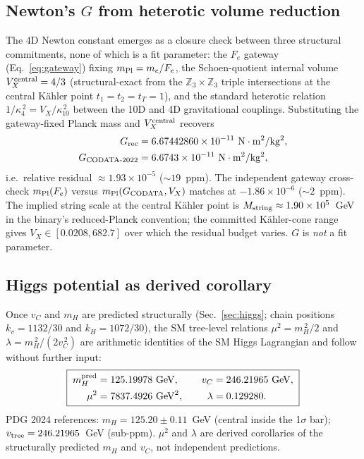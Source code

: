 ﻿\documentclass[reprint,amsmath,amssymb,aps,prd,longbibliography,floatfix]{revtex4-2}
\begin{document}
\subsection{Newton's $G$ from heterotic volume reduction}
\label{subsec:stage4-newton}

The 4D Newton constant emerges as a closure check between three
structural commitments, none of which is a fit parameter: the $F_e$
gateway (Eq.~\eqref{eq:gateway}) fixing $m_{\rm Pl} = m_e/F_e$, the
Schoen-quotient internal volume $V_X^{\rm central} = 4/3$ (structural-exact
from the $\mathbb{Z}_3 \times \mathbb{Z}_3$ triple intersections at the
central K\"ahler point $t_1 = t_2 = t_T = 1$), and the standard heterotic
relation $1/\kappa_4^{\,2} = V_X/\kappa_{10}^{\,2}$ between the 10D and
4D gravitational couplings. Substituting the gateway-fixed Planck mass
and $V_X^{\rm central}$ recovers
\begin{align*}
G_{\rm rec} &= 6.67442860 \times 10^{-11}~\mathrm{N\cdot m^2/kg^2}, \\
G_{\rm CODATA\text{-}2022} &= 6.6743 \times 10^{-11}~\mathrm{N\cdot m^2/kg^2},
\end{align*}
i.e.\ relative residual $\approx 1.93 \times 10^{-5}$ ($\sim 19$~ppm).
The independent gateway cross-check
$m_{\rm Pl}(F_e)$ versus $m_{\rm Pl}(G_{\rm CODATA}, V_X)$ matches at
$-1.86 \times 10^{-6}$ ($\sim 2$~ppm). The implied string scale at the
central K\"ahler point is $M_{\rm string} \approx 1.90 \times 10^{5}$~GeV
in the binary's reduced-Planck convention; the committed K\"ahler-cone
range gives $V_X \in [0.0208, 682.7]$ over which the residual budget
varies. $G$ is \emph{not} a fit parameter.

\subsection{Higgs potential as derived corollary}
\label{subsec:stage4-higgs}

Once $v_C$ and $m_H$ are predicted structurally
(Sec.~\ref{sec:higgs}; chain positions $k_v = 1132/30$ and
$k_H = 1072/30$), the SM tree-level relations
$\mu^2 = m_H^{\,2}/2$ and $\lambda = m_H^{\,2}/(2 v_C^{\,2})$
are arithmetic identities of the SM Higgs Lagrangian and follow
without further input:
\begin{equation}
\boxed{\;
\begin{aligned}
m_H^{\rm pred} &= 125.19978~\mathrm{GeV},
&\quad
v_C &= 246.21965~\mathrm{GeV}, \\
\mu^2 &= 7837.4926~\mathrm{GeV}^2,
&\quad
\lambda &= 0.129280.
\end{aligned}
\;}
\label{eq:stage4-higgs-corollaries}
\end{equation}
PDG 2024 references: $m_H = 125.20 \pm 0.11$~GeV (central inside the
1$\sigma$ bar); $v_{\rm tree} = 246.21965$~GeV (sub-ppm).
$\mu^2$ and $\lambda$ are derived corollaries of the structurally
predicted $m_H$ and $v_C$, not independent predictions.
\end{document}
